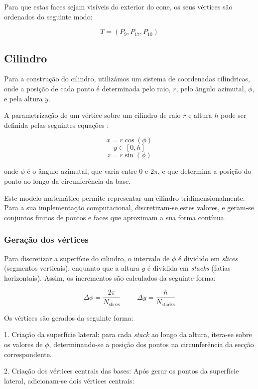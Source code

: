 \documentclass[12pt, a4paper]{article}
\begin{document}
Para que estas faces sejam visíveis do exterior do cone, os seus vértices são ordenados do seguinte
modo:

$$
T = (P_9, P_{17}, P_{10})
$$

\subsection{Cilindro}

Para a construção do cilindro, utilizámos um sistema de coordenadas cilíndricas, onde a posição de
cada ponto é determinada pelo raio, $r$, pelo ângulo azimutal, $\phi$, e pela altura $y$.

A parametrização de um vértice sobre um cilindro de raio $r$ e altura $h$ pode ser definida pelas
seguintes equações \cite{cylinder}:

$$x = r \cos(\phi)$$
$$y \in \left [ 0, h \right ]$$
$$z = r \sin(\phi)$$

onde $\phi$ é o ângulo azimutal, que varia entre $0$ e $2\pi$, e que determina a posição do ponto ao
longo da circunferência da base.

Este modelo matemático permite representar um cilindro tridimensionalmente. Para a sua implementação
computacional, discretizam-se estes valores, e geram-se conjuntos finitos de pontos e faces que
aproximam a sua forma contínua.

\subsubsection{Geração dos vértices}

Para discretizar a superfície do cilindro, o intervalo de $\phi$ é dividido em \emph{slices}
(segmentos verticais), enquanto que a altura $y$ é dividida em \emph{stacks} (fatias horizontais).
Assim, os incrementos são calculados da seguinte forma:

$$
\Delta \phi = \frac{2\pi}{N_\text{slices}}
\hspace{1cm}
\Delta y = \frac{h}{N_\text{stacks}}
$$

Os vértices são gerados da seguinte forma:

1. Criação da superfície lateral: para cada \emph{stack} ao longo da altura, itera-se sobre os
valores de $\phi$, determinando-se a posição dos pontos na circunferência da secção correspondente.

2. Criação dos vértices centrais das bases: Após gerar os pontos da superfície lateral, adicionam-se
dois vértices centrais:
\end{document}
